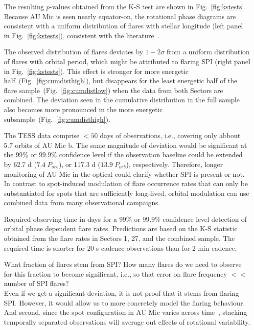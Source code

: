 \documentclass[fleqn,usenatbib,letters]{mnras}%
\begin{document}
The resulting $p$-values obtained from the K-S test are shown in Fig.~\ref{fig:kstests}. Because AU Mic is seen nearly equator-on, the rotational phase diagrams are consistent with a uniform distribution of flares with stellar longitude (left panel in Fig.~\ref{fig:kstests}), consistent with the literature~\citep{doyle2018, doyle2019}. 

The observed distribution of flares deviates by $1-2\sigma$ from a uniform distribution of flares with orbital period, which might be attributed to flaring SPI (right panel in Fig.~\ref{fig:kstests}). This effect is stronger for more energetic half~(Fig.~\ref{fig:cumdisthigh}), but disappears for the least energetic half of the flare sample~(Fig.~\ref{fig:cumdistlow}) when the data from both Sectors are combined. The deviation seen in the cumulative distribution in the full sample also becomes more pronounced in the more energetic subsample~(Fig.~\ref{fig:cumdisthigh}). 

The TESS data comprise $<50$ days of observations, i.e., covering only abbout $5.7$ orbits of AU Mic b. The same magnitude of deviation would be significant at the $99\%$ or  $99.9\%$ confidence level if the observation baseline could be extended by  62.7 d ($7.4\;P_{orb}$), or 117.3 d ($13.9\;P_{orb}$), respectively. Therefore, longer monitoring of AU Mic in the optical could clarify whether SPI is present or not. In contrast to spot-induced modulation of flare occurrence rates that can only be substantiated for spots that are sufficiently long-lived, orbital modulation can use combined data from many observational campaigns. 
\begin{table}
\caption{Required observing time in days for a $99\%$ or $99.9\%$ confidence level detection of orbital phase dependent flare rates. Predictions are based on the K-S statistic obtained from the flare rates in Sectors 1, 27, and the combined sample. The required time is shorter for 20 s cadence observations than for 2 min cadence.}
\centering

\label{tab:prediction}
\end{table}
What fraction of flares stem from SPI? How many flares do we need to observe for this fraction to become significant, i.e., so that error on flare frequency $<<$ number of SPI flares?
\\
Even if we get a significant deviation, it is not proof that it stems from flaring SPI. However, it would allow us to more concretely model the flaring behaviour. And second, since the spot configuration in AU Mic varies across time~\citep{martioli2021}, stacking temporally separated observations will average out effects of rotational variability. 
\end{document}
